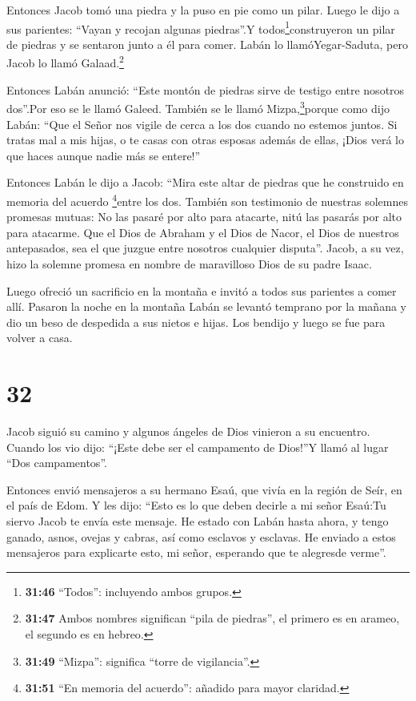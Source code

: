  Entonces Jacob tomó una piedra y la puso en pie como un
pilar.  Luego le dijo a sus parientes: ``Vayan y recojan
algunas piedras''.Y todos\footnote{\textbf{31:46} ``Todos'': incluyendo
  ambos grupos.}construyeron un pilar de piedras y se sentaron junto a
él para comer.  Labán lo llamóYegar-Saduta, pero Jacob lo
llamó Galaad.\footnote{\textbf{31:47} Ambos nombres significan ``pila de
  piedras'', el primero es en arameo, el segundo es en hebreo.}

 Entonces Labán anunció: ``Este montón de piedras sirve de
testigo entre nosotros dos''.Por eso se le llamó Galeed. 
También se le llamó Mizpa,\footnote{\textbf{31:49} ``Mizpa'': significa
  ``torre de vigilancia''.}porque como dijo Labán: ``Que el Señor nos
vigile de cerca a los dos cuando no estemos juntos.  Si
tratas mal a mis hijas, o te casas con otras esposas además de ellas,
¡Dios verá lo que haces aunque nadie más se entere!''

 Entonces Labán le dijo a Jacob: ``Mira este altar de
piedras que he construido en memoria del acuerdo \footnote{\textbf{31:51}
  ``En memoria del acuerdo'': añadido para mayor claridad.}entre los
dos.  También son testimonio de nuestras solemnes promesas
mutuas: No las pasaré por alto para atacarte, nitú las pasarás por alto
para atacarme.  Que el Dios de Abraham y el Dios de Nacor,
el Dios de nuestros antepasados, sea el que juzgue entre nosotros
cualquier disputa''. Jacob, a su vez, hizo la solemne promesa en nombre
de maravilloso Dios de su padre Isaac.

 Luego ofreció un sacrificio en la montaña e invitó a todos
sus parientes a comer allí. Pasaron la noche en la montaña 
Labán se levantó temprano por la mañana y dio un beso de despedida a sus
nietos e hijas. Los bendijo y luego se fue para volver a casa.

\hypertarget{section-31}{%
\section{32}\label{section-31}}

 Jacob siguió su camino y algunos ángeles de Dios vinieron a
su encuentro.  Cuando los vio dijo: ``¡Este debe ser el
campamento de Dios!''Y llamó al lugar ``Dos campamentos''.

 Entonces envió mensajeros a su hermano Esaú, que vivía en
la región de Seír, en el país de Edom.  Y les dijo: ``Esto
es lo que deben decirle a mi señor Esaú:Tu siervo Jacob te envía este
mensaje. He estado con Labán hasta ahora,  y tengo ganado,
asnos, ovejas y cabras, así como esclavos y esclavas. He enviado a estos
mensajeros para explicarte esto, mi señor, esperando que te alegresde
verme''.

